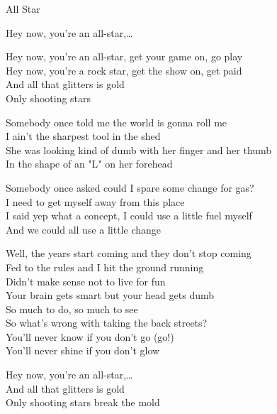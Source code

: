 \begin{song}{All Star}
  \begin{SBChorus}
    Hey now, you're an all-star,\ldots
  \end{SBChorus}

  \begin{SBChorus}
    Hey now, you're an all-star, get your game on, go play\\
    Hey now, you're a rock star, get the show on, get paid\\
    And all that glitters is gold\\
    Only shooting stars
  \end{SBChorus}

  \begin{SBSection*}
    Somebody once told me the world is gonna roll me\\
    I ain't the sharpest tool in the shed\\
    She was looking kind of dumb with her finger and her thumb\\
    In the shape of an "L" on her forehead
  \end{SBSection*}

  \begin{SBSection*}
    Somebody once asked could I spare some change for gas?\\
    I need to get myself away from this place\\
    I said yep what a concept, I could use a little fuel myself\\
    And we could all use a little change
  \end{SBSection*}

  \begin{SBVerse}
    Well, the years start coming and they don't stop coming\\
    Fed to the rules and I hit the ground running\\
    Didn't make sense not to live for fun\\
    Your brain gets smart but your head gets dumb\\
    So much to do, so much to see\\
    So what's wrong with taking the back streets?\\
    You'll never know if you don't go (go!)\\
    You'll never shine if you don't glow
  \end{SBVerse}

  \begin{SBChorus}
    Hey now, you're an all-star,\ldots\\\medskip
    And all that glitters is gold\\
    Only shooting stars break the mold\\
  \end{SBChorus}
\end{song}
